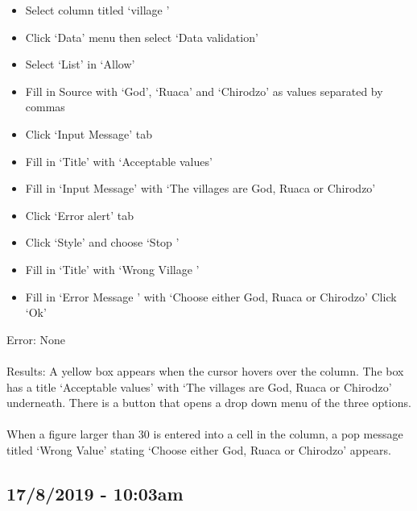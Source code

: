 \documentclass{article}
\begin{document}
\begin{itemize}
\item Select column titled ‘village ’
\item Click ‘Data’ menu then select ‘Data validation’
\item Select ‘List’ in ‘Allow’
\item Fill in Source with ‘God’, ‘Ruaca’ and ‘Chirodzo’ as values separated by commas
\item Click ‘Input Message’ tab
\item Fill in ‘Title’ with ‘Acceptable values’
\item Fill in ‘Input Message’ with ‘The villages are God, Ruaca or Chirodzo’
\item Click ‘Error alert’ tab
\item Click ‘Style’ and choose ‘Stop ’
\item Fill in ‘Title’ with ‘Wrong Village ’
\item Fill in ‘Error Message ’ with ‘Choose either God, Ruaca or Chirodzo’
Click ‘Ok’
\end{itemize}
Error: None\\\\
Results: A yellow box appears when the cursor hovers over the column. The box has a title ‘Acceptable values’ with ‘The villages are God, Ruaca or Chirodzo’ underneath. There is a button that opens a drop down menu of the three options.\\\\
When a figure larger than 30 is entered into a cell in the column, a pop message titled ‘Wrong Value’ stating ‘Choose either God, Ruaca or Chirodzo’ appears.
\subsection*{17/8/2019 - 10:03am}
\end{document}
